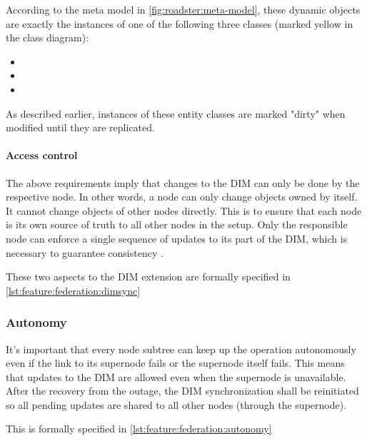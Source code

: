 According to the meta model in \autoref{fig:roadster:meta-model}, these dynamic
objects are exactly the instances of one of the following three
classes (marked yellow in the class diagram):
\begin{itemize}
	\item {}
	\item {}
	\item {}
\end{itemize}

As described earlier, instances of these entity classes are marked "dirty" when
modified until they are replicated.

\paragraph{Access control}
The above requirements imply that changes to the \gls{DIM} can only be done by the
respective node. In other words, a node can only change objects owned by itself. It
cannot change objects of other nodes directly. This is to ensure that each node is its own source of truth
to all other nodes in the setup. Only the responsible node can enforce a single
sequence of updates to its part of the DIM, which is necessary to guarantee
consistency \cite[Chapter 5, Reliable Pub-Sub (Clone Pattern), Republishing
Updates from Clients]{zmq:zguide}.

These two aspects to the DIM extension are formally specified in \autoref{lst:feature:federation:dimsync}


\subsubsection{Autonomy}
It's important that every node subtree can keep up the operation autonomously even if the
link to its supernode fails or the supernode itself fails. This means that updates to
the \gls{DIM} are allowed even when the supernode is unavailable. After the
recovery from the outage, the \gls{DIM} synchronization shall be reinitiated so
all pending updates are shared to all other nodes (through the supernode).

This is formally specified in \autoref{lst:feature:federation:autonomy}


